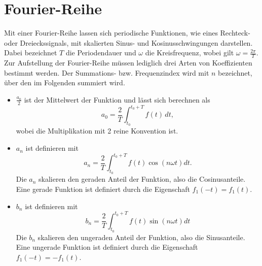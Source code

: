 %
%
%
%

\section{Fourier-Reihe\label{fourier:section:GrundlagenFourierAnalyse}}


Mit einer Fourier-Reihe lassen sich periodische Funktionen, wie eines Rechteck- oder Dreieckssignals, mit skalierten Sinus- und Kosinusschwingungen darstellen.  
Dabei bezeichnet $T$ die Periodendauer und $\omega$ die Kreisfrequenz, wobei gilt $\omega = \frac{2\pi}{T}$.
Zur Aufstellung der Fourier-Reihe müssen lediglich drei Arten von Koeffizienten bestimmt werden. 
Der Summations- bzw. Frequenzindex wird mit $n$ bezeichnet, über den im Folgenden summiert wird.




\begin{itemize}
	
	\item $\frac{a_0}{2}$ ist der Mittelwert der Funktion und lässt sich berechnen als
	\begin{equation}
		a_0 = \frac{2}{T} \int_{t_0}^{t_0 + T} f(t) \, dt,
	\end{equation}
	wobei die Multiplikation mit 2 reine Konvention ist.
	
	\item $a_n$ ist definieren mit 
	\begin{equation}
		a_n = \frac{2}{T} \int_{t_0}^{t_0 + T} f(t) \cos\left(n\omega t\right) dt.
	\end{equation}
	Die $a_n$ skalieren den geraden Anteil der Funktion, also die Cosinusanteile. 
	Eine gerade Funktion ist definiert durch die Eigenschaft $f_1(-t) = f_1(t)$. 
	
	
	\item $b_n$ ist definieren mit 
	\begin{equation}
		b_n = \frac{2}{T} \int_{t_0}^{t_0 + T} f(t) \sin\left(n\omega t\right) dt
	\end{equation}
	Die $b_n$ skalieren den ungeraden Anteil der Funktion, also die Sinusanteile. 
	Eine ungerade Funktion ist definiert durch die Eigenschaft $f_1(-t) = -f_1(t)$. 
	
\end{itemize}


